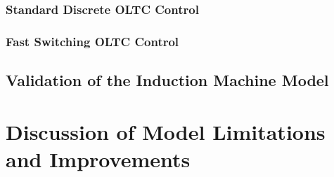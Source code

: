 \subsubsection{Standard Discrete OLTC Control}

\subsubsection{Fast Switching OLTC Control}

\subsection{Validation of the Induction Machine Model}


\section{Discussion of Model Limitations and Improvements}